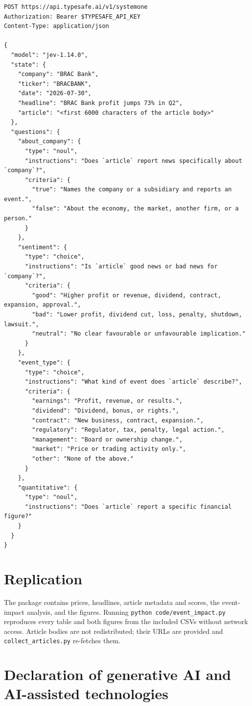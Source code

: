 \documentclass[10pt,twocolumn,a4paper]{article}
\newcommand{\code}[1]{\texttt{\small #1}}
\begin{document}
{\footnotesize
\begin{verbatim}
POST https://api.typesafe.ai/v1/systemone
Authorization: Bearer $TYPESAFE_API_KEY
Content-Type: application/json

{
  "model": "jev-1.14.0",
  "state": {
    "company": "BRAC Bank",
    "ticker": "BRACBANK",
    "date": "2026-07-30",
    "headline": "BRAC Bank profit jumps 73% in Q2",
    "article": "<first 6000 characters of the article body>"
  },
  "questions": {
    "about_company": {
      "type": "noul",
      "instructions": "Does `article` report news specifically about `company`?",
      "criteria": {
        "true": "Names the company or a subsidiary and reports an event.",
        "false": "About the economy, the market, another firm, or a person."
      }
    },
    "sentiment": {
      "type": "choice",
      "instructions": "Is `article` good news or bad news for `company`?",
      "criteria": {
        "good": "Higher profit or revenue, dividend, contract, expansion, approval.",
        "bad": "Lower profit, dividend cut, loss, penalty, shutdown, lawsuit.",
        "neutral": "No clear favourable or unfavourable implication."
      }
    },
    "event_type": {
      "type": "choice",
      "instructions": "What kind of event does `article` describe?",
      "criteria": {
        "earnings": "Profit, revenue, or results.",
        "dividend": "Dividend, bonus, or rights.",
        "contract": "New business, contract, expansion.",
        "regulatory": "Regulator, tax, penalty, legal action.",
        "management": "Board or ownership change.",
        "market": "Price or trading activity only.",
        "other": "None of the above."
      }
    },
    "quantitative": {
      "type": "noul",
      "instructions": "Does `article` report a specific financial figure?"
    }
  }
}
\end{verbatim}
}

\section{Replication}

The package contains prices, headlines, article metadata and scores, the event-impact analysis, and the
figures. Running \code{python code/event\_impact.py} reproduces every table and both figures from the
included CSVs without network access. Article bodies are not redistributed; their URLs are provided and
\code{collect\_articles.py} re-fetches them.

\section*{Declaration of generative AI and AI-assisted technologies}
\end{document}
